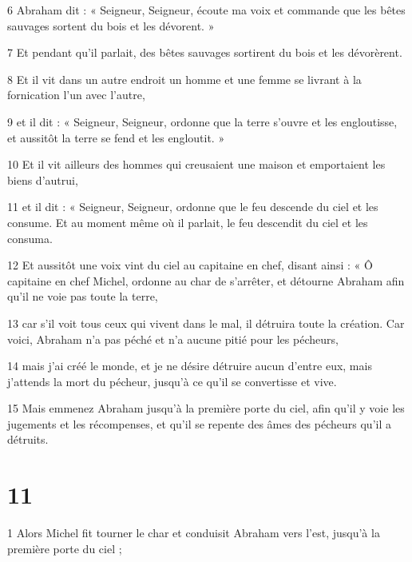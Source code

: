 \par 6 Abraham dit : « Seigneur, Seigneur, écoute ma voix et commande que les bêtes sauvages sortent du bois et les dévorent. »

\par 7 Et pendant qu'il parlait, des bêtes sauvages sortirent du bois et les dévorèrent.

\par 8 Et il vit dans un autre endroit un homme et une femme se livrant à la fornication l'un avec l'autre,

\par 9 et il dit : « Seigneur, Seigneur, ordonne que la terre s'ouvre et les engloutisse, et aussitôt la terre se fend et les engloutit. »

\par 10 Et il vit ailleurs des hommes qui creusaient une maison et emportaient les biens d'autrui,

\par 11 et il dit : « Seigneur, Seigneur, ordonne que le feu descende du ciel et les consume. Et au moment même où il parlait, le feu descendit du ciel et les consuma.

\par 12 Et aussitôt une voix vint du ciel au capitaine en chef, disant ainsi : « Ô capitaine en chef Michel, ordonne au char de s'arrêter, et détourne Abraham afin qu'il ne voie pas toute la terre,

\par 13 car s'il voit tous ceux qui vivent dans le mal, il détruira toute la création. Car voici, Abraham n’a pas péché et n’a aucune pitié pour les pécheurs,

\par 14 mais j'ai créé le monde, et je ne désire détruire aucun d'entre eux, mais j'attends la mort du pécheur, jusqu'à ce qu'il se convertisse et vive.

\par 15 Mais emmenez Abraham jusqu'à la première porte du ciel, afin qu'il y voie les jugements et les récompenses, et qu'il se repente des âmes des pécheurs qu'il a détruits.

\chapter{11}

\par 1 Alors Michel fit tourner le char et conduisit Abraham vers l'est, jusqu'à la première porte du ciel ;

